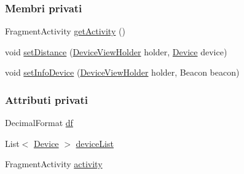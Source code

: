 \subsubsection*{Membri privati}
\begin{DoxyCompactItemize}
\item 
Fragment\+Activity \hyperlink{classit_1_1unibo_1_1torsello_1_1bluetoothpositioning_1_1adapter_1_1DeviceCardViewAdapter_a0ff32c6bf5d84b68021bf586d64cacaf_a0ff32c6bf5d84b68021bf586d64cacaf}{get\+Activity} ()
\item 
void \hyperlink{classit_1_1unibo_1_1torsello_1_1bluetoothpositioning_1_1adapter_1_1DeviceCardViewAdapter_a8d5baa2d386a92ba4fb20b71e6e517f9_a8d5baa2d386a92ba4fb20b71e6e517f9}{set\+Distance} (\hyperlink{classit_1_1unibo_1_1torsello_1_1bluetoothpositioning_1_1adapter_1_1DeviceCardViewAdapter_1_1DeviceViewHolder}{Device\+View\+Holder} holder, \hyperlink{classit_1_1unibo_1_1torsello_1_1bluetoothpositioning_1_1model_1_1Device}{Device} device)
\item 
void \hyperlink{classit_1_1unibo_1_1torsello_1_1bluetoothpositioning_1_1adapter_1_1DeviceCardViewAdapter_aa43ee1f594b3489f6e9e4b8e20ea1612_aa43ee1f594b3489f6e9e4b8e20ea1612}{set\+Info\+Device} (\hyperlink{classit_1_1unibo_1_1torsello_1_1bluetoothpositioning_1_1adapter_1_1DeviceCardViewAdapter_1_1DeviceViewHolder}{Device\+View\+Holder} holder, Beacon beacon)
\end{DoxyCompactItemize}
\subsubsection*{Attributi privati}
\begin{DoxyCompactItemize}
\item 
Decimal\+Format \hyperlink{classit_1_1unibo_1_1torsello_1_1bluetoothpositioning_1_1adapter_1_1DeviceCardViewAdapter_ae3a2fe6b4e69e1f9b8edfb9bcba14057_ae3a2fe6b4e69e1f9b8edfb9bcba14057}{df}
\item 
List$<$ \hyperlink{classit_1_1unibo_1_1torsello_1_1bluetoothpositioning_1_1model_1_1Device}{Device} $>$ \hyperlink{classit_1_1unibo_1_1torsello_1_1bluetoothpositioning_1_1adapter_1_1DeviceCardViewAdapter_a72413f87c723c585bd1ad9bc5711cf39_a72413f87c723c585bd1ad9bc5711cf39}{device\+List}
\item 
Fragment\+Activity \hyperlink{classit_1_1unibo_1_1torsello_1_1bluetoothpositioning_1_1adapter_1_1DeviceCardViewAdapter_ad9b0572ad094da8225f1c2024ac2eb61_ad9b0572ad094da8225f1c2024ac2eb61}{activity}
\end{DoxyCompactItemize}
